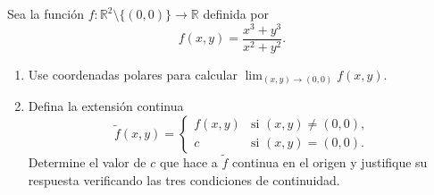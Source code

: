 Sea la función $f: \mathbb{R}^2\setminus\{(0,0)\} \to \mathbb{R}$ definida por
\[
f(x,y) = \frac{x^3 + y^3}{x^2 + y^2}.
\]
\begin{enumerate}
    \item Use coordenadas polares para calcular $\displaystyle\lim_{(x,y)\to(0,0)} f(x,y)$.
    \item Defina la extensión continua
    \[
    \tilde{f}(x,y) =
    \begin{cases}
        f(x,y) & \text{si } (x,y) \neq (0,0), \\
        c       & \text{si } (x,y) = (0,0).
    \end{cases}
    \]
    Determine el valor de $c$ que hace a $\tilde{f}$ continua en el origen y justifique su respuesta verificando las tres condiciones de continuidad.
\end{enumerate}

